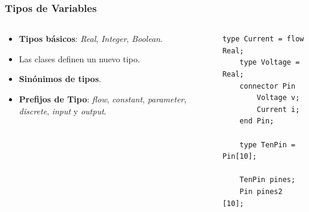 \begin{frame}[fragile]
\frametitle{Tipos de Variables} 
\begin{columns}  
\column[t]{9cm}
\begin{block}{}
    \begin{itemize}
        \item \textbf{Tipos básicos}: \textit{Real}, \textit{Integer}, \textit{Boolean}.
        \item Las clases definen un nuevo tipo.
        \item \textbf{Sinónimos de tipos}.
        \item \textbf{Prefijos de Tipo}: \textit{flow}, \textit{constant}, \textit{parameter}, \textit{discrete}, \textit{input} y \textit{output}.
    \end{itemize} 
\end{block}
\column[t]{5cm}
\begin{lstlisting}[style=base]
    type Current = flow Real;
    type Voltage = Real;
    connector Pin
        Voltage v;
        Current i;
    end Pin;
    
    type TenPin = Pin[10];
    
    TenPin pines;
    Pin pines2 [10];
\end{lstlisting}
\par
\end{columns}
\end{frame}


